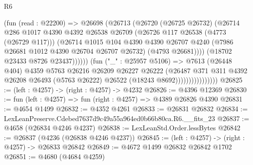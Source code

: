 \begin{lexlean}{R6}
\begin{coremodule}
                                    (fun (read : @22200) =>
                                    @26698
                                      (@26713
                                        (@26720
                                          (@26725 @26732)
                                          (@26714
                                            @286
                                            @1017
                                            @4390
                                            @4392
                                            @26538
                                            @26709
                                            (@26726 @117 @26538 (@4773 (@26729 @117)))
                                            (@26714
                                              @1015
                                              @104
                                              @4390
                                              @4390
                                              @26707
                                              @4240
                                              (@7986 @26681 @1012 @4390 @26704 @26707 @26732)
                                              (@4793 @26681))))
                                        (@18702 @23433 @8726 @23437))))))
                              (fun ("_" : @25957 @5106) =>
                              @7613
                                (@26448 @404)
                                @4359
                                @5763
                                @26216
                                @26209
                                @26227
                                @26222
                                (@26487
                                  @371
                                  @311
                                  @4392
                                  @26208
                                  @26493
                                  (@5763 @26222)
                                  @26522
                                  (@18243 @8692))))))))))))))))
@26825 := (left : @4257) -> (right : @4257) -> @4232
@26826 := @4396 @12369
@26830 := fun (left : @4257) => fun (right : @4257) => @4389 @26826 @4390
@26831 := @4654 @1499
@26832 := @4352 @4261
@26833 := @26831 @26832
@26834 := LexLeanPreserve.Cdebed7637d9c49a55a964ed0b66b80ca.R6.__fits_23
@26837 := @4658 (@26834 @4246 @4237)
@26838 := LexLeanStd.Order.lessBytes
@26842 := @26837 (@4236 (@26838 @4246 @4237))
@26845 := (left : @4257) -> (right : @4257) -> @26833 @26842
@26849 := @4672 @1499 @26832 @26842 @1702
@26851 := @4680 (@4684 @4259)

\end{coremodule}
\end{lexlean}
